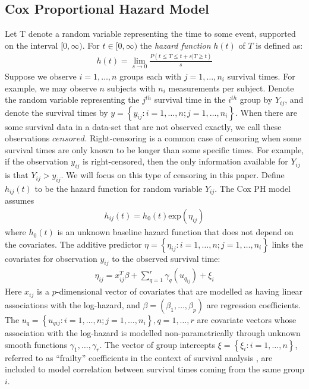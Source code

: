 \documentclass[]{article}
\begin{document}
\subsection{Cox Proportional Hazard Model}
Let T denote a random variable representing the time to some event, supported on the interval $[0,\infty)$. For $t\in[0,\infty)$ the \textit{hazard function} $h(t)$ of $T$ is defined as:
\begin{equation}\begin{aligned}\label{eqn:hazard}
h(t) = \lim_{s\to 0} \frac{P(t\le T \le t+s |T\ge t)}{s}
\end{aligned}\end{equation}
Suppose we observe $i = 1,\ldots,n$ groups each with $j = 1,\ldots,n_{i}$ survival times. For example, we may observe $n$ subjects with $n_{i}$ measurements per subject. Denote the random variable representing the $j^{th}$ survival time in the $i^{th}$ group by $Y_{ij}$, and denote the survival times by $y = \left\{y_{ij}: i = 1,\ldots,n; j = 1,\ldots,n_{i} \right\}$. When there are some survival data in a data-set that are not observed exactly, we call these observations $censored$. Right-censoring is a common case of censoring when some survival times are only known to be longer than some specific times. For example, if the observation $y_{ij}$ is right-censored, then the only information available for $Y_{ij}$ is that $Y_{ij} > y_{ij}$. We will focus on this type of censoring in this paper.
Define $h_{ij}(t)$ to be the hazard function for random variable $Y_{ij}$. The Cox PH model assumes \citep{coxph}
\begin{equation}\begin{aligned}\label{eqn:CoxHazardModel}
h_{ij}(t) = h_0(t)\text{exp}(\eta_{ij})
\end{aligned}\end{equation}
where $h_0(t)$ is an unknown baseline hazard function that does not depend on the covariates. The additive predictor $\eta = \left\{ \eta_{ij}: i = 1,\ldots,n; j = 1,\ldots,n_{i}\right\}$ links the covariates for observation $y_{ij}$ to the observed survival time:
\begin{equation}\begin{aligned}\label{eqn:eta}
\eta_{ij} =x_{ij}^{T}\beta+\sum_{q=1}^{r} \gamma_q(u_{q_{ij}}) +\xi_{i}
\end{aligned}\end{equation}
Here $x_{ij}$ is a $p$-dimensional vector of covariates that are modelled as having linear associations with the log-hazard, and $\beta = (\beta_{1},\ldots,\beta_{p})$ are regression coefficients. The $u_{q} = \left\{u_{qij}: i = 1,\ldots,n; j = 1,\ldots,n_{i} \right\}, q = 1,\ldots,r$ are covariate vectors whose association with the log-hazard is modelled non-parametrically through unknown smooth functions $\gamma_1,\ldots,\gamma_r$. The vector of group intercepts $\xi = \left\{ \xi_{i}: i=1,\ldots,n\right\}$, referred to as ``frailty'' coefficients in the context of survival analysis \citep{frailty}, are included to model correlation between survival times coming from the same group $i$.
\end{document}
